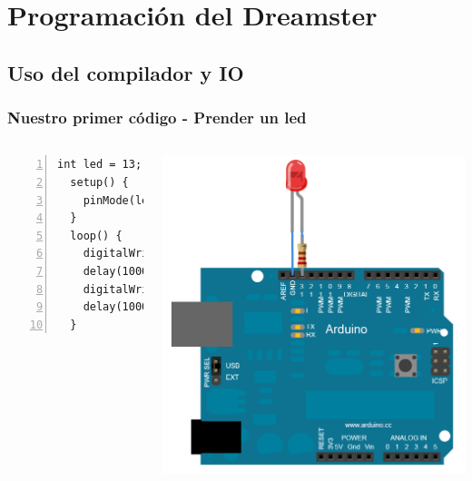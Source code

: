 \documentclass[compress]{beamer}
\begin{document}
\section{Programación del Dreamster}
\subsection{Uso del compilador y IO}

\begin{frame}[fragile]
\frametitle{Nuestro primer código - Prender un led}

\begin{columns}
  \begin{Verbatim}[formatcom=\color{red},fontseries=b, numbers=left,numbersep=3pt]
  int led = 13;
  setup() {
    pinMode(led, OUTPUT);
  }
  loop() {
    digitalWrite(led, HIGH);
    delay(1000);
    digitalWrite(led, LOW);
    delay(1000);
  }
  \end{Verbatim} 

   \includegraphics[width=\columnwidth]{./img/arduino_led.png}

\end{columns}
\end{frame}
\end{document}

